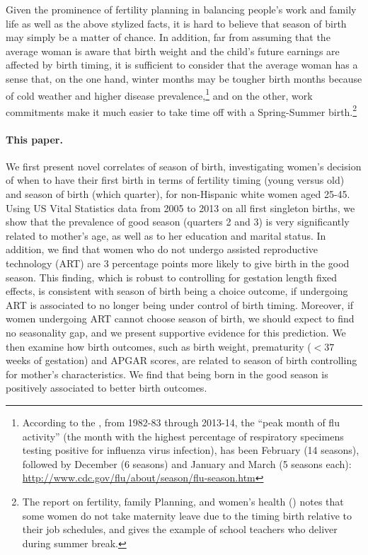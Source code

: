 \documentclass[a4paper, 12 pt]{article}
\theoremstyle{plain}
\begin{document}
\begin{doublespace}
Given the prominence of fertility planning in balancing people's work and family life as well as the above stylized facts, it is hard to believe that season of birth may simply be a matter of chance. In addition, far from assuming that the average woman is aware that birth weight and the child's future earnings are affected by birth timing, it is sufficient to consider that the average woman has a sense that, on the one hand, winter months may be tougher birth months because of cold weather and higher disease prevalence,\footnote{According to the \citet{CDC2014}, from 1982-83 through 2013-14, the ``peak month of flu activity'' (the month with the highest percentage of respiratory specimens testing positive for influenza virus infection), has been February (14 seasons), followed by December (6 seasons) and January and March (5 seasons each): \href{http://www.cdc.gov/flu/about/season/flu-season.htm}{http://www.cdc.gov/flu/about/season/flu-season.htm}} and on the other, work commitments make it much easier to take time off with a Spring-Summer birth.\footnote{The report on fertility, family Planning, and women's health (\citealp{CDC1997}) notes that some women do not take maternity leave due to the timing birth relative to their job schedules, and gives the example of school teachers who deliver during summer break.}

\paragraph{This paper.} We first present novel correlates of season of birth, investigating women's decision of when to have their first birth in terms of fertility timing (young versus old) and season of birth (which quarter), for non-Hispanic white women aged 25-45. Using US Vital Statistics data from 2005 to 2013 on all first singleton births, we show that the prevalence of good season (quarters 2 and 3) is very significantly related to mother's age, as well as to her education and marital status. In addition, we find that women who do not undergo assisted reproductive technology (ART) are 3 percentage points more likely to give birth in the good season. This finding, which is robust to controlling for gestation length fixed effects, is consistent with season of birth being a choice outcome, if undergoing ART is associated to no longer being under control of birth timing. Moreover, if women undergoing ART cannot choose season of birth, we should expect to find no seasonality gap, and we present supportive evidence for this prediction. We then examine how birth outcomes, such as birth weight, prematurity ($<37$ weeks of gestation) and APGAR scores, are related to season of birth controlling for mother's characteristics. We find that being born in the good season is positively associated to better birth outcomes.


\end{doublespace}
\end{document}
